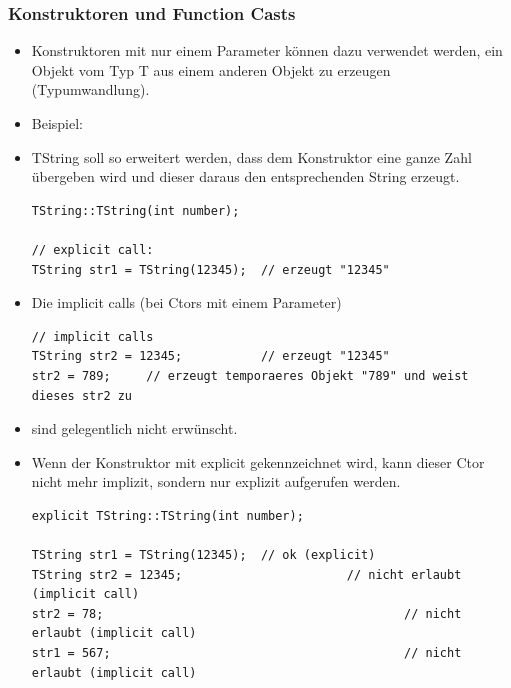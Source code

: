 \subsubsection{Konstruktoren und Function Casts}
\begin{itemize}
	\item Konstruktoren mit nur einem Parameter können dazu verwendet werden, ein Objekt vom Typ T aus einem anderen Objekt zu erzeugen (Typumwandlung).
	\item Beispiel:
	\item[\-] TString soll so erweitert werden, dass dem Konstruktor eine ganze Zahl übergeben wird und dieser daraus den entsprechenden String erzeugt.\\
	\vspace{-\baselineskip}
	\begin{minipage}{\linewidth}
\begin{lstlisting}
TString::TString(int number);

// explicit call:
TString str1 = TString(12345);	// erzeugt "12345"
\end{lstlisting}
	\end{minipage}
	\item Die implicit calls (bei Ctors mit einem Parameter)\\
	\vspace{-\baselineskip}
	\begin{minipage}{\linewidth}
\begin{lstlisting}
// implicit calls
TString str2 = 12345;			// erzeugt "12345"
str2 = 789;		// erzeugt temporaeres Objekt "789" und weist dieses str2 zu
\end{lstlisting}
	\end{minipage}
	\item[\-] sind gelegentlich nicht erwünscht.
	\item Wenn der Konstruktor mit explicit gekennzeichnet wird, kann dieser Ctor nicht mehr implizit, sondern nur explizit aufgerufen werden.
	\begin{minipage}{\linewidth}
\begin{lstlisting}
explicit TString::TString(int number);

TString str1 = TString(12345);	// ok (explicit)
TString str2 = 12345;						// nicht erlaubt (implicit call)
str2 = 78;											// nicht erlaubt (implicit call)
str1 = 567;											// nicht erlaubt (implicit call)
\end{lstlisting}
	\end{minipage}
\end{itemize}

